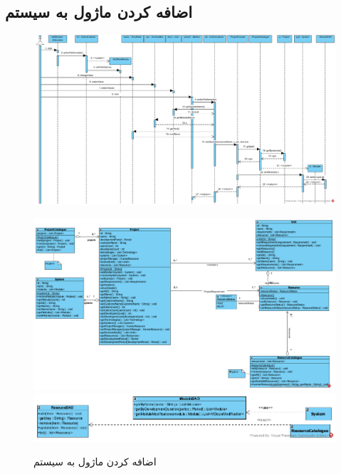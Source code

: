\begin{landscape}
\section{اضافه کردن ماژول به سیستم}
\begin{figure}[H]
	\centering
	\includegraphics[scale=0.55]{img/sequence-design/AddModuleToSystem}
\end{figure}
\begin{figure}[H]
	\centering
	\includegraphics[scale=0.65]{img/sequence-design/AddModuleToSystemC}
	\includegraphics[scale=0.65]{img/sequence-design/AddModuleToSystemD}
	\caption{اضافه کردن ماژول به سیستم}
\end{figure}
\end{landscape}


